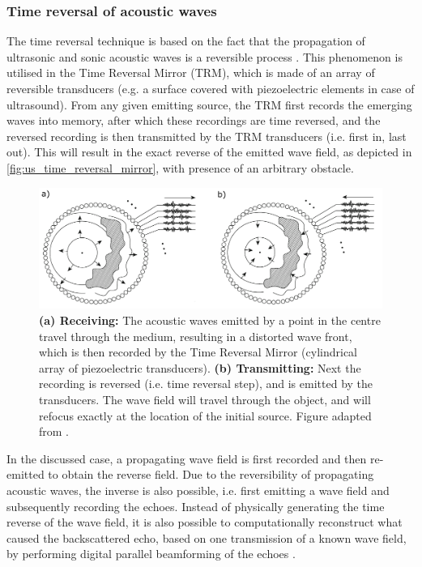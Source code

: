 \subsubsection{Time reversal of acoustic waves}
The time reversal technique is based on the fact that the propagation of ultrasonic and sonic acoustic waves is a reversible process \cite{tanter_time_2009}. This phenomenon is utilised in the Time Reversal Mirror (TRM), which is made of an array of reversible transducers (e.g. a surface covered with piezoelectric elements in case of ultrasound). From any given emitting source, the TRM first records the emerging waves into memory, after which these recordings are time reversed, and the reversed recording is then transmitted by the TRM transducers (i.e. first in, last out). This will result in the exact reverse of the emitted wave field, as depicted in \autoref{fig:us_time_reversal_mirror}, with presence of an arbitrary obstacle. 

\begin{figure}[t]
    \centering
    \includegraphics[width=\linewidth]{Figures/Ultrasound/time_reverval_mirror_2.pdf}
    \caption{\textbf{(a) Receiving:} The acoustic waves emitted by a point in the centre travel through the medium, resulting in a distorted wave front, which is then recorded by the Time Reversal Mirror (cylindrical array of piezoelectric transducers). \textbf{(b) Transmitting:} Next the recording is reversed (i.e. time reversal step), and is emitted by the transducers. The wave field will travel through the object, and will refocus exactly at the location of the initial source. Figure adapted from \citet{tanter_time_2009}.}
    \label{fig:us_time_reversal_mirror}
\end{figure}


In the discussed case, a propagating wave field is first recorded and then re-emitted to obtain the reverse field. Due to the reversibility of propagating acoustic waves, the inverse is also possible, i.e. first emitting a wave field and subsequently recording the echoes. Instead of physically generating the time reverse of the wave field, it is also possible to computationally reconstruct what caused the backscattered echo, based on one transmission of a known wave field, by performing digital parallel beamforming of the echoes \cite{tanter_ultrafast_2014}.




